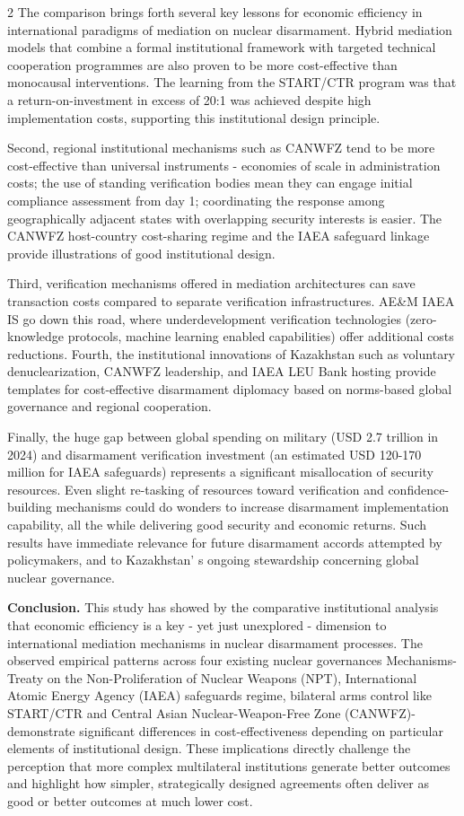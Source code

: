 \begin{multicols}{2}
The comparison brings forth several key lessons for economic efficiency
in international paradigms of mediation on nuclear disarmament. Hybrid
mediation models that combine a formal institutional framework with
targeted technical cooperation programmes are also proven to be more
cost-effective than monocausal interventions. The learning from the
START/CTR program was that a return-on-investment in excess of 20:1 was
achieved despite high implementation costs, supporting this
institutional design principle.

Second, regional institutional mechanisms such as CANWFZ tend to be more
cost-effective than universal instruments - economies of scale in
administration costs; the use of standing verification bodies mean they
can engage initial compliance assessment from day 1; coordinating the
response among geographically adjacent states with overlapping security
interests is easier. The CANWFZ host-country cost-sharing regime and the
IAEA safeguard linkage provide illustrations of good institutional
design.

Third, verification mechanisms offered in mediation architectures can
save transaction costs compared to separate verification
infrastructures. AE\&M IAEA IS go down this road, where underdevelopment
verification technologies (zero-knowledge protocols, machine learning
enabled capabilities) offer additional costs reductions. Fourth, the
institutional innovations of Kazakhstan such as voluntary
denuclearization, CANWFZ leadership, and IAEA LEU Bank hosting provide
templates for cost-effective disarmament diplomacy based on norms-based
global governance and regional cooperation.

Finally, the huge gap between global spending on military (USD 2.7
trillion in 2024) and disarmament verification investment (an estimated
USD 120-170 million for IAEA safeguards) represents a significant
misallocation of security resources. Even slight re-tasking of resources
toward verification and confidence-building mechanisms could do wonders
to increase disarmament implementation capability, all the while
delivering good security and economic returns. Such results have
immediate relevance for future disarmament accords attempted by
policymakers, and to Kazakhstan' s ongoing stewardship
concerning global nuclear governance.

{\bfseries Conclusion.} This study has showed by the comparative
institutional analysis that economic efficiency is a key - yet just
unexplored - dimension to international mediation mechanisms in nuclear
disarmament processes. The observed empirical patterns across four
existing nuclear governances Mechanisms-Treaty on the Non-Proliferation
of Nuclear Weapons (NPT), International Atomic Energy Agency (IAEA)
safeguards regime, bilateral arms control like START/CTR and Central
Asian Nuclear-Weapon-Free Zone (CANWFZ)-demonstrate significant
differences in cost-effectiveness depending on particular elements of
institutional design. These implications directly challenge the
perception that more complex multilateral institutions generate better
outcomes and highlight how simpler, strategically designed agreements
often deliver as good or better outcomes at much lower cost.


\end{multicols}
